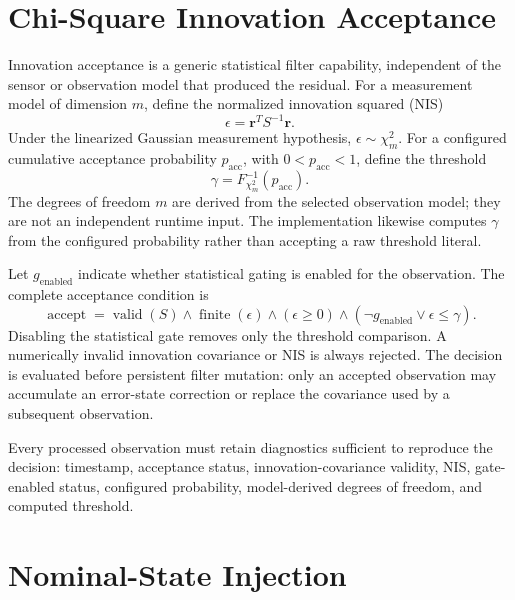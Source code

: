 \section{Chi-Square Innovation Acceptance}
\label{sec:v1_chi_square_innovation_acceptance}

Innovation acceptance is a generic statistical filter capability, independent
of the sensor or observation model that produced the residual. For a
measurement model of dimension $m$, define the normalized innovation squared
(NIS)
\begin{equation}
\epsilon
=
\mathbf{r}^T S^{-1}\mathbf{r}.
\label{eq:v1_nis}
\end{equation}
Under the linearized Gaussian measurement hypothesis,
$\epsilon\sim\chi^2_m$. For a configured cumulative acceptance probability
$p_{\mathrm{acc}}$, with $0<p_{\mathrm{acc}}<1$, define the threshold
\begin{equation}
\gamma
=
F_{\chi^2_m}^{-1}\!\left(p_{\mathrm{acc}}\right).
\label{eq:v1_chi_square_gate_threshold}
\end{equation}
The degrees of freedom $m$ are derived from the selected observation model;
they are not an independent runtime input. The implementation likewise
computes $\gamma$ from the configured probability rather than accepting a raw
threshold literal.

Let $g_{\mathrm{enabled}}$ indicate whether statistical gating is enabled for
the observation. The complete acceptance condition is
\begin{equation}
\boxed{
\operatorname{accept}
=
\operatorname{valid}(S)
\land
\operatorname{finite}(\epsilon)
\land
\left(\epsilon\geq 0\right)
\land
\left(\neg g_{\mathrm{enabled}}\lor\epsilon\leq\gamma\right).
}
\label{eq:v1_chi_square_gate_acceptance}
\end{equation}
Disabling the statistical gate removes only the threshold comparison. A
numerically invalid innovation covariance or NIS is always rejected. The
decision is evaluated before persistent filter mutation: only an accepted
observation may accumulate an error-state correction or replace the covariance
used by a subsequent observation.

Every processed observation must retain diagnostics sufficient to reproduce
the decision: timestamp, acceptance status, innovation-covariance validity,
NIS, gate-enabled status, configured probability, model-derived degrees of
freedom, and computed threshold.

\section{Nominal-State Injection}

